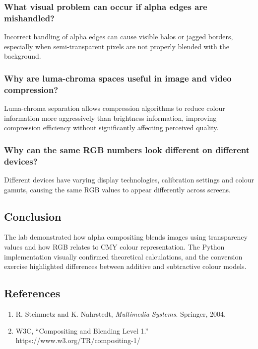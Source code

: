 \documentclass[12pt,a4paper]{article}
\begin{document}
\subsubsection{What visual problem can occur if alpha edges are mishandled?}

Incorrect handling of alpha edges can cause visible halos or jagged borders, especially when semi-transparent pixels are not properly blended with the background.

\subsubsection{Why are luma-chroma spaces useful in image and video compression?}

Luma-chroma separation allows compression algorithms to reduce colour information more aggressively than brightness information, improving compression efficiency without significantly affecting perceived quality.

\subsubsection{Why can the same RGB numbers look different on different devices?}

Different devices have varying display technologies, calibration settings and colour gamuts, causing the same RGB values to appear differently across screens.

\subsection{Conclusion}

The lab demonstrated how alpha compositing blends images using transparency values and how RGB relates to CMY colour representation. The Python implementation visually confirmed theoretical calculations, and the conversion exercise highlighted differences between additive and subtractive colour models.

\subsection{References}

\begin{enumerate}
    \item R. Steinmetz and K. Nahrstedt, \textit{Multimedia Systems}. Springer, 2004.
    \item W3C, ``Compositing and Blending Level 1.'' https://www.w3.org/TR/compositing-1/
\end{enumerate}
\end{document}
